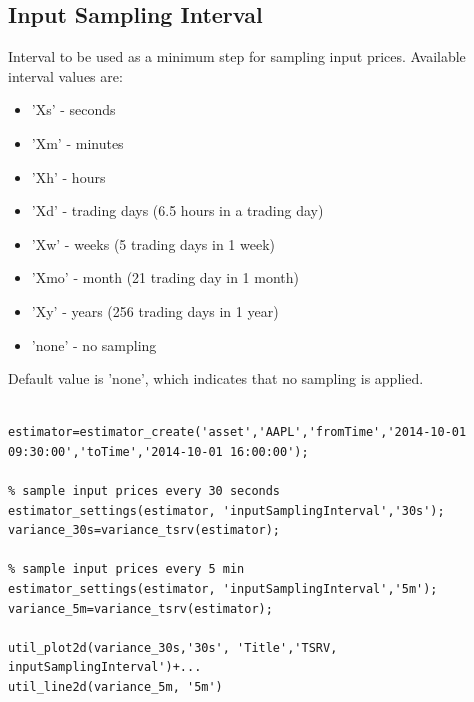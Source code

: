 \documentclass[letterpaper]{report}
\begin{document}
\subsection{Input Sampling Interval}
Interval to be used as a minimum step for sampling input prices. Available interval values are: 
\begin{itemize} 
  \item 'Xs' - seconds
  \item 'Xm' - minutes
  \item 'Xh' - hours
  \item 'Xd' - trading days (6.5 hours in a trading day)
  \item 'Xw' - weeks (5 trading days in 1 week)
  \item 'Xmo' - month (21 trading day in 1 month)
  \item 'Xy' - years (256 trading days in 1 year)
  \item 'none' - no sampling
\end{itemize}
Default value is 'none', which indicates that no sampling is applied.
\begin{lstlisting}

estimator=estimator_create('asset','AAPL','fromTime','2014-10-01 09:30:00','toTime','2014-10-01 16:00:00');

% sample input prices every 30 seconds
estimator_settings(estimator, 'inputSamplingInterval','30s');
variance_30s=variance_tsrv(estimator);

% sample input prices every 5 min
estimator_settings(estimator, 'inputSamplingInterval','5m');
variance_5m=variance_tsrv(estimator);

util_plot2d(variance_30s,'30s', 'Title','TSRV, inputSamplingInterval')+...
util_line2d(variance_5m, '5m')
\end{lstlisting}
\end{document}
